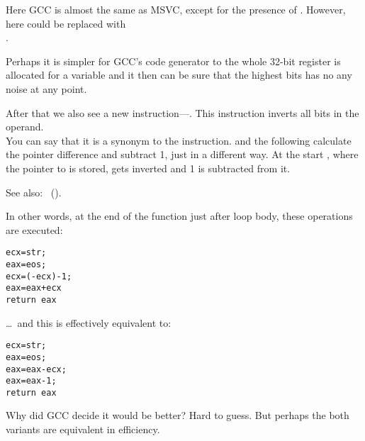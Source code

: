 Here GCC is almost the same as MSVC, except for the presence of \MOVZX.
However, here \MOVZX could be replaced with\\
.

Perhaps it is simpler for GCC's code generator to  
the whole 32-bit \EDX register 
is allocated for a \Tchar variable and it then can be sure that the highest bits has no any noise 
at any point.

\label{strlen_NOT_ADD}

After that we also see a new instruction---\NOT. This instruction inverts all bits in the operand. \\
You can say that it is a synonym to the  instruction. 
\NOT and the following \ADD calculate the pointer difference and subtract 1, just in a different way. 
At the start \ECX, where the pointer to  is stored, gets inverted and 1 is subtracted from it.

See also: \q{\SignedNumbersSectionName}~().
 
In other words, at the end of the function just after loop body, these operations are executed:

\begin{lstlisting}[style=customc]
ecx=str;
eax=eos;
ecx=(-ecx)-1; 
eax=eax+ecx
return eax
\end{lstlisting}

\dots~and this is effectively equivalent to:

\begin{lstlisting}[style=customc]
ecx=str;
eax=eos;
eax=eax-ecx;
eax=eax-1;
return eax
\end{lstlisting}

Why did GCC decide it would be better? Hard to guess. 
But perhaps the both variants are equivalent in efficiency.
